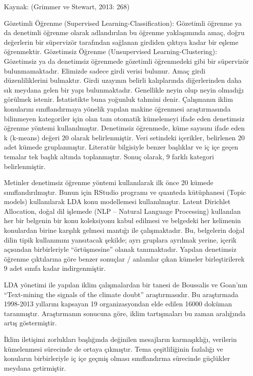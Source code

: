 \documentclass[
]{book}
\begin{document}
Kaynak: (Grimmer ve Stewart, 2013: 268)

Gözetimli Öğrenme (Supervised Learning-Classification): Gözetimli öğrenme ya da denetimli öğrenme olarak adlandırılan bu öğrenme yaklaşımında amaç, doğru değerlerin bir süpervizör tarafından sağlanan girdiden çıktıya kadar bir eşleme öğrenmektir.
Gözetimsiz Öğrenme (Unsupervised Learning-Clustering): Gözetimsiz ya da denetimsiz öğrenmede gözetimli öğrenmedeki gibi bir süpervizör bulunmamaktadır. Elimizde sadece girdi verisi bulunur. Amaç girdi düzenliliklerini bulmaktır. Girdi uzayının belirli kalıplarında diğerlerinden daha sık meydana gelen bir yapı bulunmaktadır. Genellikle neyin olup neyin olmadığı görülmek istenir. İstatistikte buna yoğunluk tahmini denir.
Çalışmanın iklim konularını sınıflandırmaya yönelik yapılan makine öğrenmesi araştırmasında bilinmeyen kategoriler için olan tam otomatik kümelemeyi ifade eden denetimsiz öğrenme yöntemi kullanılmıştır. Denetimsiz öğrenmede, küme sayısını ifade eden k (k-means) değeri 20 olarak belirlenmiştir. Veri setindeki içerikler, belirlenen 20 adet kümede gruplanmıştır. Literatür bilgisiyle benzer başlıklar ve iç içe geçen temalar tek başlık altında toplanmıştır. Sonuç olarak, 9 farklı kategori belirlenmiştir.

Metinler denetimsiz öğrenme yöntemi kullanılarak ilk önce 20 kümede sınıflandırılmıştır. Bunun için RStudio programı ve quanteda kütüphanesi (Topic models) kullanılarak LDA konu modellemesi kullanılmıştır. Latent Dirichlet Allocation, doğal dil işlemede (NLP -- Natural Language Processing) kullanılan her bir belgenin bir konu koleksiyonu kabul edilmesi ve belgedeki her kelimenin konulardan birine karşılık gelmesi mantığı ile çalışmaktadır. Bu, belgelerin doğal dilin tipik kullanımını yansıtacak şekilde; ayrı gruplara ayrılmak yerine, içerik açısından birbirleriyle ``örtüşmesine'' olanak tanımaktadır. \citep{silge2018text} Yapılan denetimsiz öğrenme çıktılarına göre benzer sonuçlar / anlamlar çıkan kümeler birleştirilerek 9 adet sınıfa kadar indirgenmiştir.

LDA yönetimi ile yapılan iklim çalışmalardan bir tanesi de Boussalis ve Goan'nın ``Text-mining the signals of the climate doubt'' araştırmasıdır. Bu araştırmada 1998-2013 yıllarını kapsayan 19 organizasyondan elde edilen 16000 doküman taranmıştır. Araştırmanın sonucuna göre, iklim tartışmaları bu zaman aralığında artış göstermiştir. \citep{boussalis2016text}

İklim iletişimi zorlukları başlığında değinilen mesajların karmaşıklığı, verilerin kümelenmesi sürecinde de ortaya çıkmıştır. Tema çeşitliliğinin fazlalığı ve konuların birbirleriyle iç içe geçmiş olması sınıflandırma sürecinde güçlükler meydana getirmiştir.
\end{document}
